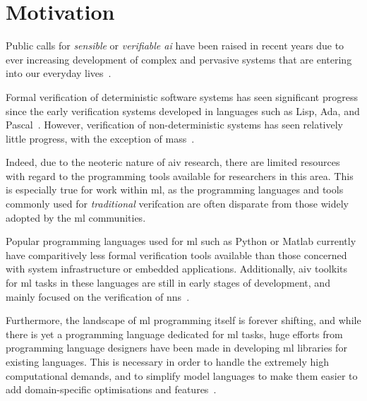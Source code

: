 \section{Motivation}

Public calls for \textit{sensible} or \textit{verifiable \Gls{ai}} have been raised in recent years due to ever increasing
development of complex and pervasive systems that are entering into our everyday lives~\citep{russell2016}.

Formal verification of deterministic software systems has seen significant progress since the early
verification systems developed in languages such as Lisp, Ada, and Pascal~\citep{polak1979, boyer1990, guaspari1993}. However,
verification of non-deterministic systems has seen relatively little progress, with the exception of
\Glspl{mas}~\citep{lomuscio2017, kouvaros2016}.

Indeed, due to the neoteric nature of \gls{aiv} research, there are limited resources with regard to the 
programming tools available for researchers in this area. This is especially true for work
within \gls{ml}, as the programming languages and tools commonly used for \textit{traditional} verifcation are often
disparate from those widely adopted by the \gls{ml} communities. 

Popular programming languages used for \gls{ml} such as Python or Matlab currently have comparitively less
formal verification tools available than those concerned with system infrastructure or embedded applications.
Additionally, \gls{aiv} toolkits for \gls{ml} tasks in these languages are still in early stages of development, and mainly focused
on the verification of \glspl{nn}~\citep{kokke2020}. 

Furthermore, the landscape of \gls{ml} programming itself is forever shifting, and while there is yet a programming 
language dedicated for \gls{ml} tasks, huge efforts from programming language designers have been made 
in developing \gls{ml} libraries for existing languages. This is necessary in order to handle the 
extremely high computational demands, and to simplify 
model languages to make them easier to add domain-specific optimisations and features~\citep{innes2017}.

